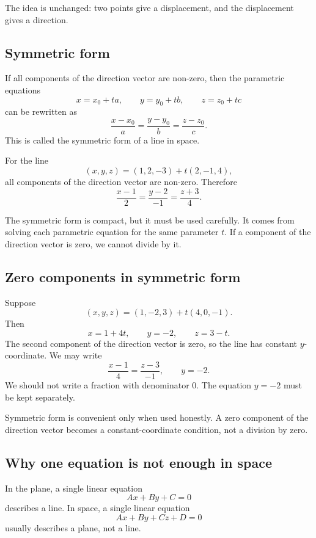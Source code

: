 The idea is unchanged: two points give a displacement, and the displacement gives a direction.

\subsection*{Symmetric form}

If all components of the direction vector are non-zero, then the parametric equations
\[
x=x_0+ta,
\qquad
y=y_0+tb,
\qquad
z=z_0+tc
\]
can be rewritten as
\[
\frac{x-x_0}{a}=\frac{y-y_0}{b}=\frac{z-z_0}{c}.
\]
This is called the symmetric form of a line in space.

\begin{examplebox}
For the line
\[
(x,y,z)=(1,2,-3)+t(2,-1,4),
\]
all components of the direction vector are non-zero. Therefore
\[
\frac{x-1}{2}=\frac{y-2}{-1}=\frac{z+3}{4}.
\]
\end{examplebox}

The symmetric form is compact, but it must be used carefully. It comes from solving each parametric equation for the same parameter \(t\). If a component of the direction vector is zero, we cannot divide by it.

\subsection*{Zero components in symmetric form}

Suppose
\[
(x,y,z)=(1,-2,3)+t(4,0,-1).
\]
Then
\[
x=1+4t,
\qquad
y=-2,
\qquad
z=3-t.
\]
The second component of the direction vector is zero, so the line has constant \(y\)-coordinate. We may write
\[
\frac{x-1}{4}=\frac{z-3}{-1},
\qquad
y=-2.
\]
We should not write a fraction with denominator \(0\). The equation \(y=-2\) must be kept separately.

\begin{remarkbox}
Symmetric form is convenient only when used honestly. A zero component of the direction vector becomes a constant-coordinate condition, not a division by zero.
\end{remarkbox}

\subsection*{Why one equation is not enough in space}

In the plane, a single linear equation
\[
Ax+By+C=0
\]
describes a line. In space, a single linear equation
\[
Ax+By+Cz+D=0
\]
usually describes a plane, not a line.

